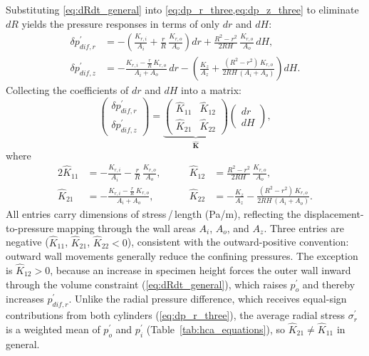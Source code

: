 Substituting \cref{eq:dRdt_general} into \cref{eq:dp_r_three,eq:dp_z_three} to eliminate $dR$ yields the pressure responses in terms of only $dr$ and $dH$:
\begin{align}
\delta p_{dif,r}^{\prime}
  &= -\!\left(\frac{K_{r,i}}{A_i}+\frac{r}{R}\,\frac{K_{r,o}}{A_o}\right)dr
     +\frac{R^2-r^2}{2RH}\,\frac{K_{r,o}}{A_o}\,dH, \label{eq:dp_r_two}\\[6pt]
\delta p_{dif,z}^{\prime}
  &= -\frac{K_{r,i}-\frac{r}{R}\,K_{r,o}}{A_i+A_o}\,dr
     -\!\left(\frac{K_z}{A_z}+\frac{(R^2-r^2)\,K_{r,o}}{2RH\,(A_i+A_o)}\right)dH. \label{eq:dp_z_two}
\end{align}
Collecting the coefficients of $dr$ and $dH$ into a matrix:
\begin{equation}
\begin{pmatrix} \delta p_{dif,r}^{\prime} \\[4pt] \delta p_{dif,z}^{\prime} \end{pmatrix}
=
\underbrace{\begin{pmatrix} \hat{K}_{11} & \hat{K}_{12} \\[8pt] \hat{K}_{21} & \hat{K}_{22} \end{pmatrix}}_{\hat{\mathbf{K}}}
\begin{pmatrix} dr \\[4pt] dH \end{pmatrix},
\label{eq:stiffness_matrix}
\end{equation}
where
\begin{alignat}{2}
\hat{K}_{11} &= -\frac{K_{r,i}}{A_i}-\frac{r}{R}\,\frac{K_{r,o}}{A_o}, &\qquad
\hat{K}_{12} &= \frac{R^2-r^2}{2RH}\,\frac{K_{r,o}}{A_o}, \label{eq:Khat_row1}\\[4pt]
\hat{K}_{21} &= -\frac{K_{r,i}-\frac{r}{R}\,K_{r,o}}{A_i+A_o}, &\qquad
\hat{K}_{22} &= -\frac{K_z}{A_z}-\frac{(R^2-r^2)\,K_{r,o}}{2RH\,(A_i+A_o)}. \label{eq:Khat_row2}
\end{alignat}
All entries carry dimensions of stress\,/\,length (Pa/m), reflecting the displacement-to-pressure mapping through the wall areas $A_i$, $A_o$, and $A_z$. Three entries are negative ($\hat{K}_{11}$, $\hat{K}_{21}$, $\hat{K}_{22}<0$), consistent with the outward-positive convention: outward wall movements generally reduce the confining pressures. The exception is $\hat{K}_{12}>0$, because an increase in specimen height forces the outer wall inward through the volume constraint (\cref{eq:dRdt_general}), which raises $p_o^{\prime}$ and thereby increases $p_{dif,r}^{\prime}$. Unlike the radial pressure difference, which receives equal-sign contributions from both cylinders (\cref{eq:dp_r_three}), the average radial stress $\sigma_r^{\prime}$ is a weighted mean of $p_o^{\prime}$ and $p_i^{\prime}$ (Table~\ref{tab:hca_equations}), so $\hat{K}_{21}\neq\hat{K}_{11}$ in general.

